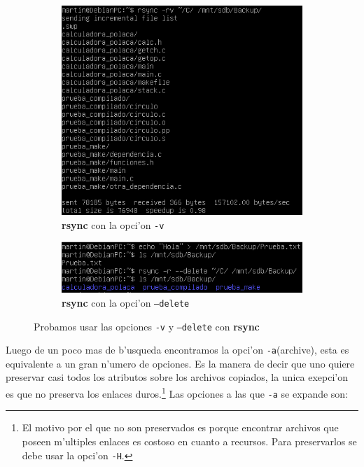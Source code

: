 \documentclass[11pt]{article}
\newcommand{\rsync}[0]{\textbf{rsync}}
\begin{document}
		\begin{figure}[h]
			\centering
			\begin{subfigure}{0.75\linewidth}
				\includegraphics[width=1\linewidth]{Images/rsync/rsync_backup_verbose.PNG}
				\caption{\rsync{} con la opci'on \texttt{-v}}
			\end{subfigure}
			\bigbreak
			\begin{subfigure}{0.7\linewidth}
				\includegraphics[width=1\linewidth]{Images/rsync/rsync_backup_delete.PNG}
				\caption{\rsync{} con la opci'on \texttt{--delete}}
			\end{subfigure}
			\caption{Probamos usar las opciones \texttt{-v} y \texttt{--delete} con \rsync{}}
			\label{fig:rsync_backup_options_1}
		\end{figure}

		Luego de un poco mas de b'usqueda encontramos la opci'on \texttt{-a}(archive), esta es equivalente a un gran n'umero de opciones. Es la manera de decir que uno quiere preservar casi todos los atributos sobre los archivos copiados, la unica exepci'on es que no preserva los enlaces duros.\footnote{El motivo por el que no son preservados es porque encontrar archivos que poseen m'ultiples enlaces es costoso en cuanto a recursos. Para preservarlos se debe usar la opci'on \texttt{-H}.} Las opciones a las que \texttt{-a} se expande son:
\end{document}
